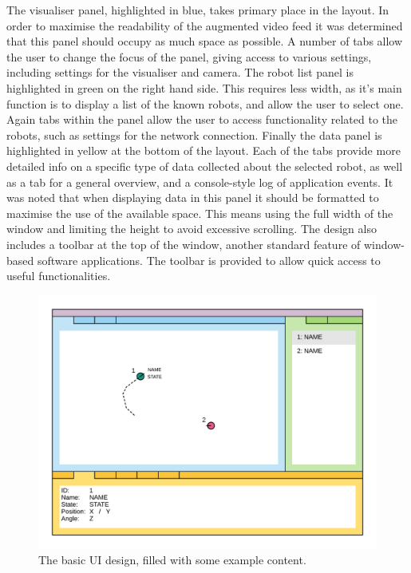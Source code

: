 The visualiser panel, highlighted in blue, takes primary place in the layout. In order to maximise the readability of the augmented video feed it was determined that this panel should occupy as much space as possible. A number of tabs allow the user to change the focus of the panel, giving access to various settings, including settings for the visualiser and camera. The robot list panel is highlighted in green on the right hand side. This requires less width, as it's main function is to display a list of the known robots, and allow the user to select one. Again tabs within the panel allow the user to access functionality related to the robots, such as settings for the network connection. Finally the data panel is highlighted in yellow at the bottom of the layout. Each of the tabs provide more detailed info on a specific type of data collected about the selected robot, as well as a tab for a general overview, and a console-style log of application events. It was noted that when displaying data in this panel it should be formatted to maximise the use of the available space. This means using the full width of the window and limiting the height to avoid excessive scrolling. The design also includes a toolbar at the top of the window, another standard feature of window-based software applications. The toolbar is provided to allow quick access to useful functionalities.

\begin{figure}[h]
	\centering
	\includegraphics[scale=1]{Figures/UIExample.png}
	\decoRule
	\caption[UI Example]{The basic UI design, filled with some example content.}
	\label{fig:UIExample}
\end{figure}

